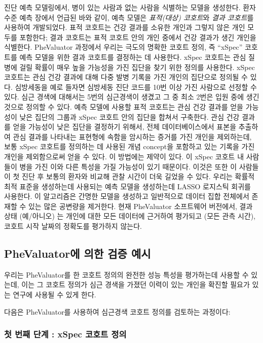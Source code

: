 \documentclass[10.5pt]{book}
\theoremstyle{definition}
\theoremstyle{definition}
\theoremstyle{definition}
\theoremstyle{remark}
\begin{document}
진단 예측 모델링에서, 병이 있는 사람과 없는 사람을 식별하는 모델을
생성한다. 환자 수준 예측 장에서 언급된 바와 같이, 예측 모델은
\emph{표적(대상) 코호트}와 \emph{결과 코호트}를 사용하여 개발되었다.
표적 코호트는 건강 결과를 소유한 개인과 그렇지 않은 개인 모두를
포함한다; 결과 코호트는 표적 코호트 안의 개인 중에서 건강 결과가 생긴
개인을 식별한다. PheValuator 과정에서 우리는 극도의 명확한 코호트 정의,
즉 ``xSpec'' 코호트를 예측 모델을 위한 결과 코호트를 결정하는 데
사용한다. xSpec 코호트는 관심 질병에 걸릴 확률이 매우 높을 가능성을 가진
집단을 찾기 위한 정의를 사용한다. xSpec 코호트는 관심 건강 결과에 대해
다중 발병 기록을 가진 개인의 집단으로 정의될 수 있다. 심방세동을 예로
들자면 심방세동 진단 코드를 10번 이상 가진 사람으로 선정할 수 있다. 심근
경색에 대해서는 5번의 심근경색이 생겼고 그 중 최소 2번은 입원 중에 생긴
것으로 정의할 수 있다. 예측 모델에 사용할 표적 코호트는 관심 건강 결과를
얻을 가능성이 낮은 집단의 그룹과 xSpec 코호트 안의 집단을 합쳐서
구축한다. 관심 건강 결과를 얻을 가능성이 낮은 집단을 결정하기 위해서,
전체 데이터베이스에서 표본을 추출하여 관심 결과를 나타내는 표현형에
속함을 암시하는 증거를 가진 개인을 제외하는데, 보통 xSpec 코호트를
정의하는 데 사용된 개념 concept을 포함하고 있는 기록을 가진 개인을
제외함으로써 얻을 수 있다. 이 방법에는 제약이 있다. 이 xSpec 코호트 내
사람들이 병을 가진 이와 다른 특성을 가질 가능성이 있기 때문이다. 이것은
또한 이 사람들이 첫 진단 후 보통의 환자와 비교해 관찰 시간이 더욱 길었을
수 있다. 우리는 확률적 최적 표준을 생성하는데 사용되는 예측 모델을
생성하는데 LASSO 로지스틱 회귀를 사용한다. \citep{suchard_2013} 이
알고리즘은 간명한 모델을 생성하고 일반적으로 데이터 집합 전체에서 존재할
수 있는 많은 공변량을 제거한다. 현재 PheValuator 소프트웨어 버전에서,
결과 상태 (예/아니오) 는 개인에 대한 모든 데이터에 근거하여 평가되고
(모든 관측 시간), 코호트 시작 날짜의 정확도를 평가하지 않는다.

\subsection{PheValuator에 의한 검증 예시}\label{phevaluator---}

우리는 PheValuator를 한 코호트 정의의 완전한 성능 특성을 평가하는데
사용할 수 있는데, 이는 그 코호트 정의가 심근 경색을 가졌던 이력이 있는
개인을 확진할 필요가 있는 연구에 사용될 수 있게 한다.

다음은 PheValuator를 사용하여 심근경색 코호트 정의를 검토하는 과정이다:

\subsubsection*{첫 번째 단계 : xSpec 코호트 정의}\label{---xspec--}
\end{document}
